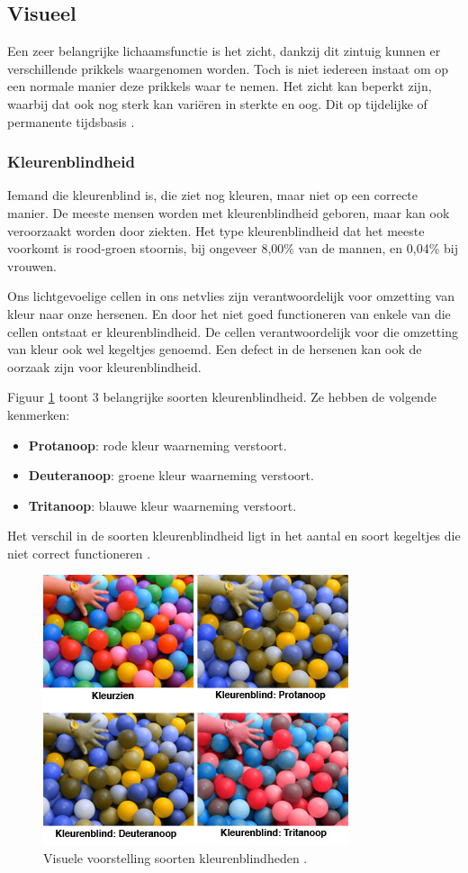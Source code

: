 \subsection{Visueel}
\label{sec:Visueel}
Een zeer belangrijke lichaamsfunctie is het zicht, dankzij dit zintuig kunnen er verschillende prikkels waargenomen worden. Toch is niet iedereen instaat om op een normale manier deze prikkels waar te nemen. Het zicht kan beperkt zijn, waarbij dat ook nog sterk kan variëren in sterkte en oog. Dit op tijdelijke of permanente tijdsbasis \autocite{accessibility2019}.

\subsubsection{Kleurenblindheid}
Iemand die kleurenblind is, die ziet nog kleuren, maar niet op een correcte manier. De meeste mensen worden met kleurenblindheid geboren, maar kan ook veroorzaakt worden door ziekten.
Het type kleurenblindheid dat het meeste voorkomt is rood-groen stoornis, bij ongeveer 8,00\% van de mannen, en 0,04\% bij vrouwen. 

Ons lichtgevoelige cellen in ons netvlies zijn verantwoordelijk voor omzetting van kleur naar onze hersenen. En door het niet goed functioneren van enkele van die cellen ontstaat er kleurenblindheid. De cellen verantwoordelijk voor die omzetting van kleur ook wel kegeltjes genoemd. Een defect in de hersenen kan ook de oorzaak zijn voor kleurenblindheid. 

Figuur \ref{fig:ballenbak} toont 3 belangrijke soorten kleurenblindheid. Ze hebben de volgende kenmerken: 
\begin{itemize}
    \item \textbf{Protanoop}: rode kleur waarneming verstoort.
    \item \textbf{Deuteranoop}: groene kleur waarneming verstoort.
    \item \textbf{Tritanoop}: blauwe kleur waarneming verstoort.
\end{itemize}

Het verschil in de soorten kleurenblindheid ligt in het aantal en soort kegeltjes die niet correct functioneren \autocite{visioKleur2019}.



\begin{figure}[!h]
    \centering
    \includegraphics[width=0.5\linewidth]{img/ballenbak}
    \caption{Visuele voorstelling soorten kleurenblindheden \autocite{visioKleur2019}.}
    \label{fig:ballenbak}
\end{figure}



